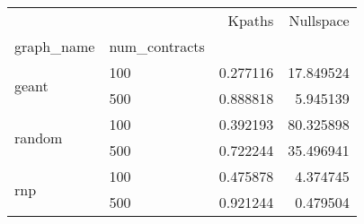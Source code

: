 \begin{tabular}{llrr}
\toprule
 &  & Kpaths & Nullspace \\
graph_name & num_contracts &  &  \\
\midrule
\multirow[t]{2}{*}{geant} & 100 & 0.277116 & 17.849524 \\
 & 500 & 0.888818 & 5.945139 \\
\cline{1-4}
\multirow[t]{2}{*}{random} & 100 & 0.392193 & 80.325898 \\
 & 500 & 0.722244 & 35.496941 \\
\cline{1-4}
\multirow[t]{2}{*}{rnp} & 100 & 0.475878 & 4.374745 \\
 & 500 & 0.921244 & 0.479504 \\
\cline{1-4}
\bottomrule
\end{tabular}
